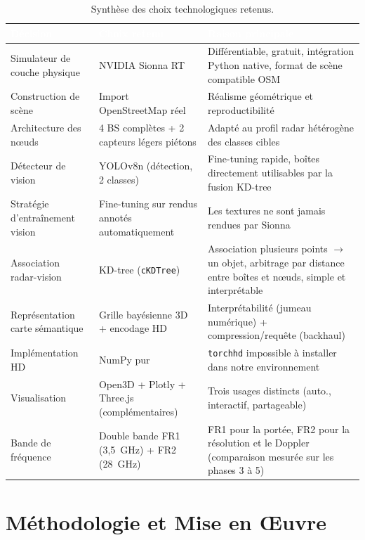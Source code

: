 \documentclass[12pt,a4paper,titlepage]{article}
\newcommand{\hd}[1]{\textcolor{white}{\textbf{#1}}}
\begin{document}
\begin{table}[H]
    \centering
    \caption{Synthèse des choix technologiques retenus.}
    \begin{tabularx}{\textwidth}{F{3.8cm}LL}
        \toprule
        \hd{Décision} & \hd{Choix retenu} & \hd{Raison principale} \\
        \midrule
        Simulateur de couche physique & NVIDIA Sionna RT & Différentiable, gratuit, intégration Python native, format de scène compatible OSM \\
        Construction de scène & Import OpenStreetMap réel & Réalisme géométrique et reproductibilité \\
        Architecture des n\oe uds & 4 BS complètes + 2 capteurs légers piétons & Adapté au profil radar hétérogène des classes cibles \\
        Détecteur de vision & YOLOv8n (détection, 2 classes) & Fine-tuning rapide, boîtes directement utilisables par la fusion KD-tree \\
        Stratégie d'entraînement vision & Fine-tuning sur rendus annotés automatiquement & Les textures ne sont jamais rendues par Sionna \\
        Association radar-vision & KD-tree (\texttt{cKDTree}) & Association plusieurs points $\to$ un objet, arbitrage par distance entre boîtes et n\oe uds, simple et interprétable \\
        Représentation carte sémantique & Grille bayésienne 3D + encodage HD & Interprétabilité (jumeau numérique) + compression/requête (backhaul) \\
        Implémentation HD & NumPy pur & \texttt{torchhd} impossible à installer dans notre environnement \\
        Visualisation & Open3D + Plotly + Three.js (complémentaires) & Trois usages distincts (auto., interactif, partageable) \\
        Bande de fréquence & Double bande FR1 (3,5~GHz) + FR2 (28~GHz) & FR1 pour la portée, FR2 pour la résolution et le Doppler (comparaison mesurée sur les phases 3 à 5) \\
        \bottomrule
    \end{tabularx}
\end{table}

\section{Méthodologie et Mise en \OE uvre}
\label{sec:methodologie}
\end{document}
